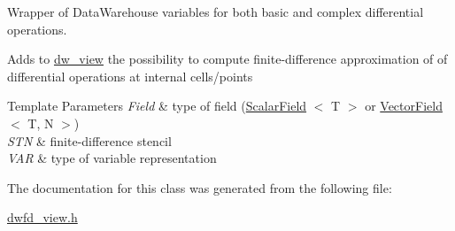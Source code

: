 Wrapper of Data\+Warehouse variables for both basic and complex differential operations. 

Adds to \hyperlink{classUintah_1_1PhaseField_1_1detail_1_1dw__view}{dw\+\_\+view} the possibility to compute finite-\/difference approximation of of differential operations at internal cells/points


\begin{DoxyTemplParams}{Template Parameters}
{\em Field} & type of field (\hyperlink{structUintah_1_1PhaseField_1_1ScalarField}{Scalar\+Field} $<$ T $>$ or \hyperlink{structUintah_1_1PhaseField_1_1VectorField}{Vector\+Field} $<$ T, N $>$) \\
\hline
{\em S\+TN} & finite-\/difference stencil \\
\hline
{\em V\+AR} & type of variable representation \\
\hline
\end{DoxyTemplParams}


The documentation for this class was generated from the following file\+:\begin{DoxyCompactItemize}
\item 
\hyperlink{dwfd__view_8h}{dwfd\+\_\+view.\+h}\end{DoxyCompactItemize}
